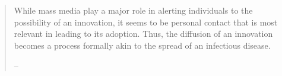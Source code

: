   \begin{quote}
    While mass media play a major role in alerting individuals to the
    possibility of an innovation, it seems to be personal contact that is
    most relevant in leading to its adoption. Thus, the diffusion of an
    innovation becomes a process formally akin to the spread of an
    infectious disease.

\medskip
        \indent -- \href{https://github.com/iworld1991/EpiExp/blob/master/Literature/arrow_classificatory_1969.pdf}{\cite{arrow_classificatory_1969}}
  \end{quote}

